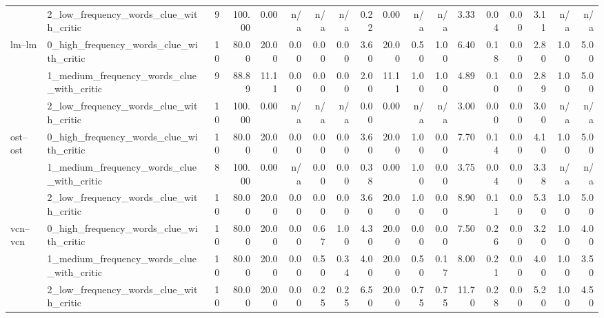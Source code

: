 \begin{tabular}{llrrrrrrrrrrrrrrrr}
 & 2_low_frequency_words_clue_with_critic & 9 & 100.00 & 0.00 & n/a & n/a & n/a & 0.22 & 0.00 & n/a & n/a & 3.33 & 0.04 & 0.00 & 3.11 & n/a & n/a \\
\cline{1-18}
\multirow[t]{3}{*}{lm--lm} & 0_high_frequency_words_clue_with_critic & 10 & 80.00 & 20.00 & 0.00 & 0.00 & 0.00 & 3.60 & 20.00 & 0.50 & 1.00 & 6.40 & 0.18 & 0.00 & 2.80 & 1.00 & 5.00 \\
 & 1_medium_frequency_words_clue_with_critic & 9 & 88.89 & 11.11 & 0.00 & 0.00 & 0.00 & 2.00 & 11.11 & 1.00 & 1.00 & 4.89 & 0.10 & 0.00 & 2.89 & 1.00 & 5.00 \\
 & 2_low_frequency_words_clue_with_critic & 10 & 100.00 & 0.00 & n/a & n/a & n/a & 0.00 & 0.00 & n/a & n/a & 3.00 & 0.00 & 0.00 & 3.00 & n/a & n/a \\
\cline{1-18}
\multirow[t]{3}{*}{ost--ost} & 0_high_frequency_words_clue_with_critic & 10 & 80.00 & 20.00 & 0.00 & 0.00 & 0.00 & 3.60 & 20.00 & 1.00 & 0.00 & 7.70 & 0.14 & 0.00 & 4.10 & 1.00 & 5.00 \\
 & 1_medium_frequency_words_clue_with_critic & 8 & 100.00 & 0.00 & n/a & 0.00 & 0.00 & 0.38 & 0.00 & 1.00 & 0.00 & 3.75 & 0.04 & 0.00 & 3.38 & n/a & n/a \\
 & 2_low_frequency_words_clue_with_critic & 10 & 80.00 & 20.00 & 0.00 & 0.00 & 0.00 & 3.60 & 20.00 & 1.00 & 0.00 & 8.90 & 0.11 & 0.00 & 5.30 & 1.00 & 5.00 \\
\cline{1-18}
\multirow[t]{3}{*}{vcn--vcn} & 0_high_frequency_words_clue_with_critic & 10 & 80.00 & 20.00 & 0.00 & 0.67 & 1.00 & 4.30 & 20.00 & 0.00 & 0.00 & 7.50 & 0.26 & 0.00 & 3.20 & 1.00 & 4.00 \\
 & 1_medium_frequency_words_clue_with_critic & 10 & 80.00 & 20.00 & 0.00 & 0.50 & 0.34 & 4.00 & 20.00 & 0.50 & 0.17 & 8.00 & 0.21 & 0.00 & 4.00 & 1.00 & 3.50 \\
 & 2_low_frequency_words_clue_with_critic & 10 & 80.00 & 20.00 & 0.00 & 0.25 & 0.25 & 6.50 & 20.00 & 0.75 & 0.75 & 11.70 & 0.28 & 0.00 & 5.20 & 1.00 & 4.50 \\
\cline{1-18}
\bottomrule
\end{tabular}
